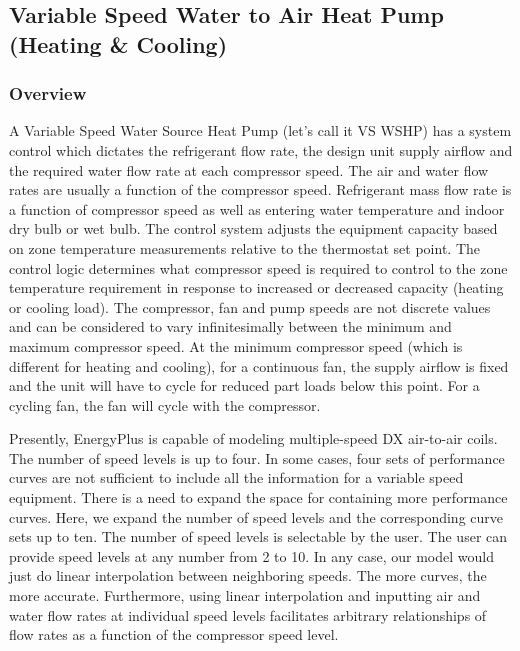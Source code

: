 \subsection{Variable Speed Water to Air Heat Pump (Heating \& Cooling)}\label{variable-speed-water-to-air-heat-pump-heating-cooling}

\subsubsection{Overview}\label{overview-13}

A Variable Speed Water Source Heat Pump (let's call it VS WSHP) has a system control which dictates the refrigerant flow rate, the design unit supply airflow and the required water flow rate at each compressor speed. The air and water flow rates are usually a function of the compressor speed. Refrigerant mass flow rate is a function of compressor speed as well as entering water temperature and indoor dry bulb or wet bulb. The control system adjusts the equipment capacity based on zone temperature measurements relative to the thermostat set point. The control logic determines what compressor speed is required to control to the zone temperature requirement in response to increased or decreased capacity (heating or cooling load). The compressor, fan and pump speeds are not discrete values and can be considered to vary infinitesimally between the minimum and maximum compressor speed. At the minimum compressor speed (which is different for heating and cooling), for a continuous fan, the supply airflow is fixed and the unit will have to cycle for reduced part loads below this point. For a cycling fan, the fan will cycle with the compressor.

Presently, EnergyPlus is capable of modeling multiple-speed DX air-to-air coils. The number of speed levels is up to four. In some cases, four sets of performance curves are not sufficient to include all the information for a variable speed equipment. There is a need to expand the space for containing more performance curves. Here, we expand the number of speed levels and the corresponding curve sets up to ten. The number of speed levels is selectable by the user. The user can provide speed levels at any number from 2 to 10. In any case, our model would just do linear interpolation between neighboring speeds. The more curves, the more accurate. Furthermore, using linear interpolation and inputting air and water flow rates at individual speed levels facilitates arbitrary relationships of flow rates as a function of the compressor speed level.

